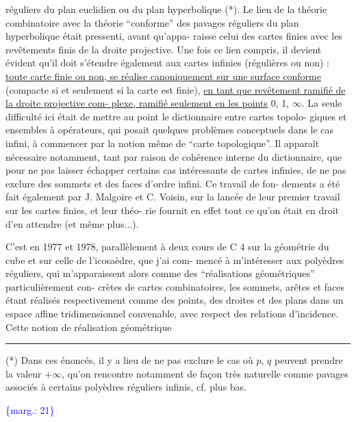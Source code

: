 \documentclass[11pt]{article}
\newcommand{\scanpage}[1]{\par\bigskip\noindent{\small\sffamily[scan #1]}\par}
\newcommand{\mspage}[1]{{\small\sffamily[p.\,#1]}}
\newcommand{\margin}[1]{\textcolor{blue}{\{\textsf{marg.:} #1\}}}
\newcommand{\uline}[1]{\underline{#1}}
\begin{document}
réguliers du plan euclidien ou du plan hyperbolique (*). Le lien
de la théorie combinatoire avec la théorie ``conforme'' des pavages
réguliers du plan hyperbolique était pressenti, avant qu'appa-%
raisse celui des cartes finies avec les revêtements finis de la
droite projective. Une fois ce lien compris, il devient évident
qu'il doit s'étendre également aux cartes infinies (régulières
ou non) : \uline{toute carte finie ou non, se réalise canoniquement sur
une surface conforme} (compacte si et seulement si la carte est
finie), \uline{en tant que revêtement ramifié de la droite projective com-%
plexe, ramifié seulement en les points} 0, 1, $\infty$. La seule difficulté
ici était de mettre au point le dictionnaire entre cartes topolo-%
giques et ensembles à opérateurs, qui posait quelques problèmes
conceptuels dans le cas infini, à commencer par la notion même de
``carte topologique''. Il apparaît nécessaire notamment, tant par
raison de cohérence interne du dictionnaire, que pour ne pas laisser
échapper certains cas intéressants de cartes infinies, de ne pas
exclure des sommets et des faces d'ordre infini. Ce travail de fon-%
dements a été fait également par J. Malgoire et C. Voisin, sur la
lancée de leur premier travail sur les cartes finies, et leur théo-%
rie fournit en effet tout ce qu'on était en droit d'en attendre
(et même plus...).

C'est en 1977 et 1978, parallèlement à deux cours de C 4
sur la géométrie du cube et sur celle de l'icosaèdre, que j'ai com-%
mencé à m'intéresser aux polyèdres réguliers, qui m'apparaissent
alors comme des ``réalisations géométriques'' particulièrement con-%
crètes de cartes combinatoires, les sommets, arêtes et faces étant
réalisés respectivement comme des points, des droites et des plans
dans un espace affine tridimensionnel convenable, avec respect des
relations d'incidence. Cette notion de réalisation géométrique

\rule{4cm}{0.4pt}

(*) Dans ces énoncés, il y a lieu de ne pas exclure le cas où $p$, $q$
peuvent prendre la valeur $+\infty$, qu'on rencontre notamment de façon
très naturelle comme pavages associés à certains polyèdres réguliers
infinis, cf. plus bas.

\margin{21}

\clearpage
\scanpage{119/22}
\mspage{20}
\end{document}
